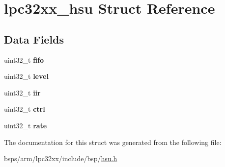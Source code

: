 \hypertarget{structlpc32xx__hsu}{}\section{lpc32xx\+\_\+hsu Struct Reference}
\label{structlpc32xx__hsu}
\subsection*{Data Fields}
\begin{DoxyCompactItemize}
\item 
\mbox{\label{structlpc32xx__hsu_a4a7dbb744c10e17e427aac0b4e64908a}} 
uint32\+\_\+t {\bfseries fifo}
\item 
\mbox{\label{structlpc32xx__hsu_a0dfe962d3f36aa855b0ef1e30d8b54a0}} 
uint32\+\_\+t {\bfseries level}
\item 
\mbox{\label{structlpc32xx__hsu_a3816261eb5b8395b691d05186b901607}} 
uint32\+\_\+t {\bfseries iir}
\item 
\mbox{\label{structlpc32xx__hsu_ad18b0711c2776868df84bdb36564081b}} 
uint32\+\_\+t {\bfseries ctrl}
\item 
\mbox{\label{structlpc32xx__hsu_a3a2508ba9e5e24f5c4744258c208f54b}} 
uint32\+\_\+t {\bfseries rate}
\end{DoxyCompactItemize}


The documentation for this struct was generated from the following file\+:\begin{DoxyCompactItemize}
\item 
bsps/arm/lpc32xx/include/bsp/\mbox{\hyperlink{hsu_8h}{hsu.\+h}}\end{DoxyCompactItemize}
